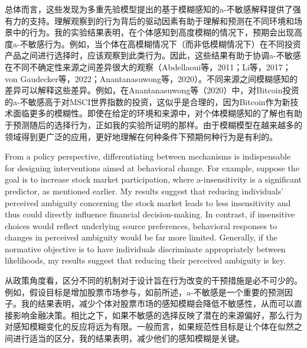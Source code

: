 \documentclass[12pt,a4paper]{article}
\newenvironment{original}
  {\par\medskip\noindent\color{black}\ignorespaces}
  {\par\medskip}
\newenvironment{translation}
  {\par\noindent\color{transblue}\ignorespaces}
  {\par\medskip\medskip}
\begin{document}
\begin{translation}
总体而言，这些发现为多重先验模型提出的基于模糊感知的a-不敏感解释提供了强有力的支持。理解观察到的行为背后的驱动因素有助于理解和预测在不同环境和场景中的行为。我的实验结果表明，在个体感知到高度模糊的情况下，预期会出现高度a-不敏感行为。例如，当个体在高模糊情况下（而非低模糊情况下）在不同投资产品之间进行选择时，应该观察到此类行为。因此，这些结果有助于协调a-不敏感在不同不确定性来源之间差异很大的观察（Abdellaoui等，2011；Li等，2017；von Gaudecker等，2022；Anantanasuwong等，2020）。不同来源之间模糊感知的差异可以解释这些差异。例如，在Anantanasuwong等（2020）中，对Bitcoin投资的a-不敏感高于对MSCI世界指数的投资，这似乎是合理的，因为Bitcoin作为新技术面临更多的模糊性。即使在给定的环境和来源中，对个体模糊感知的了解也有助于预测随后的选择行为，正如我的实验所证明的那样。由于模糊模型在越来越多的领域得到更广泛的应用，更好地理解在何种条件下预期何种行为是有利的。
\end{translation}

\begin{original}
From a policy perspective, differentiating between mechanisms is indispensable for designing interventions aimed at behavioral change. For example, suppose the goal is to increase stock market participation, where a-insensitivity is a significant predictor, as mentioned earlier. My results suggest that reducing individuals' perceived ambiguity concerning the stock market leads to less insensitivity and thus could directly influence financial decision-making. In contrast, if insensitive choices would reflect underlying source preferences, behavioral responses to changes in perceived ambiguity would be far more limited. Generally, if the normative objective is to have individuals discriminate appropriately between likelihoods, my results suggest that reducing their perceived ambiguity is key.
\end{original}

\begin{translation}
从政策角度看，区分不同的机制对于设计旨在行为改变的干预措施是必不可少的。例如，假设目标是增加股票市场参与，如前所述，a-不敏感是一个重要的预测因子。我的结果表明，减少个体对股票市场的感知模糊会降低不敏感性，从而可以直接影响金融决策。相比之下，如果不敏感的选择反映了潜在的来源偏好，那么行为对感知模糊变化的反应将远为有限。一般而言，如果规范性目标是让个体在似然之间进行适当的区分，我的结果表明，减少他们的感知模糊是关键。
\end{translation}
\end{document}
